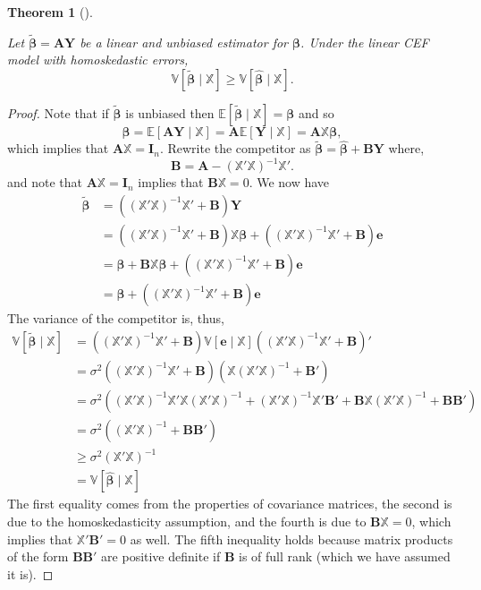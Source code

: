 \documentclass[
  letterpaper,
  DIV=11,
  numbers=noendperiod]{scrreprt}
\newcommand{\mb}{\symbf}
\newcommand{\E}{\mathbb{E}}
\newcommand{\V}{\mathbb{V}}
\newcommand{\Xmat}{\mathbb{X}}
\newcommand{\bfbeta}{\mb{\beta}}
\newcommand{\bhat}{\widehat{\mb{\beta}}}
\theoremstyle{plain}
\newtheorem{theorem}{Theorem}[chapter]
\theoremstyle{definition}
\theoremstyle{definition}
\theoremstyle{remark}
\begin{document}
\begin{theorem}[]\protect\hypertarget{thm-gauss-markov}{}\label{thm-gauss-markov}

Let \(\widetilde{\bfbeta} = \mb{AY}\) be a linear and unbiased estimator
for \(\bfbeta\). Under the linear CEF model with homoskedastic errors,
\[
\V[\widetilde{\bfbeta}\mid \Xmat] \geq \V[\bhat \mid \Xmat]. 
\]

\end{theorem}

\begin{proof}

Note that if \(\widetilde{\bfbeta}\) is unbiased then
\(\E[\widetilde{\bfbeta} \mid \Xmat] = \bfbeta\) and so \[
\bfbeta = \E[\mb{AY} \mid \Xmat] = \mb{A}\E[\mb{Y} \mid \Xmat] = \mb{A}\Xmat\bfbeta,
\] which implies that \(\mb{A}\Xmat = \mb{I}_n\). Rewrite the competitor
as \(\widetilde{\bfbeta} = \bhat + \mb{BY}\) where, \[ 
\mb{B} = \mb{A} - \left(\Xmat'\Xmat\right)^{-1}\Xmat'.
\] and note that \(\mb{A}\Xmat = \mb{I}_n\) implies that
\(\mb{B}\Xmat = 0\). We now have \[ 
\begin{aligned}
  \widetilde{\bfbeta} &= \left( \left(\Xmat'\Xmat\right)^{-1}\Xmat' + \mb{B}\right)\mb{Y} \\
                      &= \left( \left(\Xmat'\Xmat\right)^{-1}\Xmat' + \mb{B}\right)\Xmat\bfbeta + \left( \left(\Xmat'\Xmat\right)^{-1}\Xmat' + \mb{B}\right)\mb{e} \\
                      &= \bfbeta + \mb{B}\Xmat\bfbeta + \left( \left(\Xmat'\Xmat\right)^{-1}\Xmat' + \mb{B}\right)\mb{e} \\
  &= \bfbeta + \left( \left(\Xmat'\Xmat\right)^{-1}\Xmat' + \mb{B}\right)\mb{e}
\end{aligned}
\] The variance of the competitor is, thus, \[ 
\begin{aligned}
  \V[\widetilde{\bfbeta} \mid \Xmat]
  &= \left( \left(\Xmat'\Xmat\right)^{-1}\Xmat' + \mb{B}\right)\V[\mb{e}\mid \Xmat]\left( \left(\Xmat'\Xmat\right)^{-1}\Xmat' + \mb{B}\right)' \\
  &= \sigma^{2}\left( \left(\Xmat'\Xmat\right)^{-1}\Xmat' + \mb{B}\right)\left( \Xmat\left(\Xmat'\Xmat\right)^{-1} + \mb{B}'\right) \\
  &= \sigma^{2}\left(\left(\Xmat'\Xmat\right)^{-1}\Xmat'\Xmat\left(\Xmat'\Xmat\right)^{-1} + \left(\Xmat'\Xmat\right)^{-1}\Xmat'\mb{B}' + \mb{B}\Xmat\left(\Xmat'\Xmat\right)^{-1} + \mb{BB}'\right)\\
  &= \sigma^{2}\left(\left(\Xmat'\Xmat\right)^{-1} + \mb{BB}'\right)\\
  &\geq \sigma^{2}\left(\Xmat'\Xmat\right)^{-1} \\
  &= \V[\bhat \mid \Xmat]
\end{aligned}
\] The first equality comes from the properties of covariance matrices,
the second is due to the homoskedasticity assumption, and the fourth is
due to \(\mb{B}\Xmat = 0\), which implies that \(\Xmat'\mb{B}' = 0\) as
well. The fifth inequality holds because matrix products of the form
\(\mb{BB}'\) are positive definite if \(\mb{B}\) is of full rank (which
we have assumed it is).

\end{proof}
\end{document}
